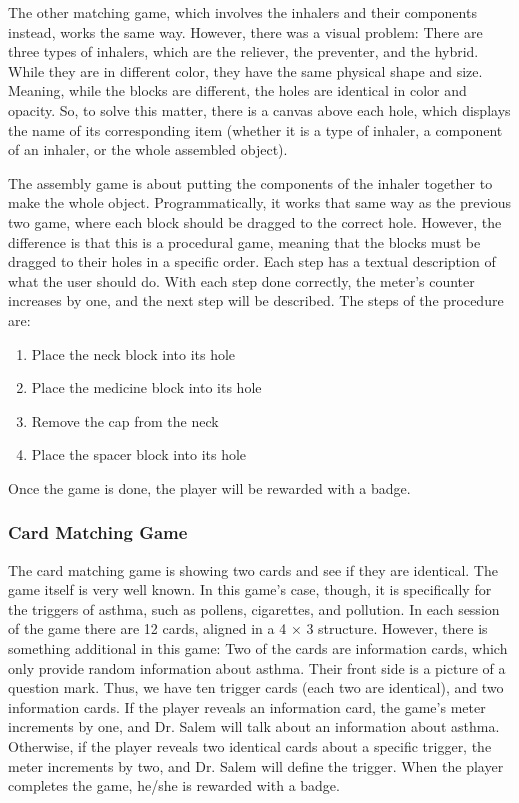 The other matching game, which involves the inhalers and their components instead, works the same way. However, there was a visual problem: There are three types of inhalers, which are the reliever, the preventer, and the hybrid. While they are in different color, they have the same physical shape and size. Meaning, while the blocks are different, the holes are identical in color and opacity. So, to solve this matter, there is a canvas above each hole, which displays the name of its corresponding item (whether it is a type of inhaler, a component of an inhaler, or the whole assembled object).

The assembly game is about putting the components of the inhaler together to make the whole object. Programmatically, it works that same way as the previous two game, where each block should be dragged to the correct hole. However, the difference is that this is a procedural game, meaning that the blocks must be dragged to their holes in a specific order. Each step has a textual description of what the user should do. With each step done correctly, the meter’s counter increases by one, and the next step will be described. The steps of the procedure are:
\begin{enumerate}
\item{Place the neck block into its hole}

\item{Place the medicine block into its hole}

\item{Remove the cap from the neck}

\item{Place the spacer block into its hole}
\end{enumerate}
Once the game is done, the player will be rewarded with a badge.
\subsubsection*{Card Matching Game}
The card matching game is showing two cards and see if they are identical. The game itself is very well known. In this game’s case, though, it is specifically for the triggers of asthma, such as pollens, cigarettes, and pollution. In each session of the game there are 12 cards, aligned in a 4 × 3 structure. However, there is something additional in this game: Two of the cards are information cards, which only provide random information about asthma. Their front side is a picture of a question mark. Thus, we have ten trigger cards (each two are identical), and two information cards. If the player reveals an information card, the game’s meter increments by one, and Dr. Salem will talk about an information about asthma. Otherwise, if the player reveals two identical cards about a specific trigger, the meter increments by two, and Dr. Salem will define the trigger. When the player completes the game, he/she is rewarded with a badge.
